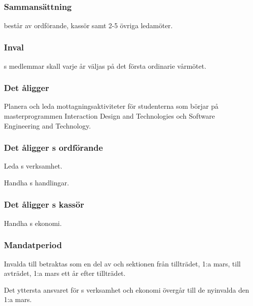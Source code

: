 \subsection{\MRCITFULL}
\subsubsection{Sammansättning}
\MRCIT{} består av ordförande, kassör samt 2-5 övriga ledamöter.

\subsubsection{Inval}
\MRCIT{}s medlemmar skall varje år väljas på det första ordinarie vårmötet.

\subsubsection{Det åligger \MRCIT}
\begin{att}
  \item Planera och leda mottagningsaktiviteter för studenterna som börjar på masterprogrammen Interaction Design and Technologies och Software Engineering and Technology.
\end{att}

\subsubsection{Det åligger \MRCIT{}s ordförande}
\begin{att}
  \item Leda \MRCIT{}s verksamhet.
  \item Handha \MRCIT{}s handlingar.
\end{att}

\subsubsection{Det åligger \MRCIT{}s kassör}
\begin{att}
  \item Handha \MRCIT{}s ekonomi.
\end{att}

\subsubsection{Mandatperiod}
Invalda till \MRCIT{} betraktas som en del av \MRCIT{} och sektionen från tillträdet, 1:a mars, till avträdet, 1:a mars ett år efter tillträdet.

Det yttersta ansvaret för \MRCIT{}s verksamhet och ekonomi övergår till de nyinvalda den 1:a mars.